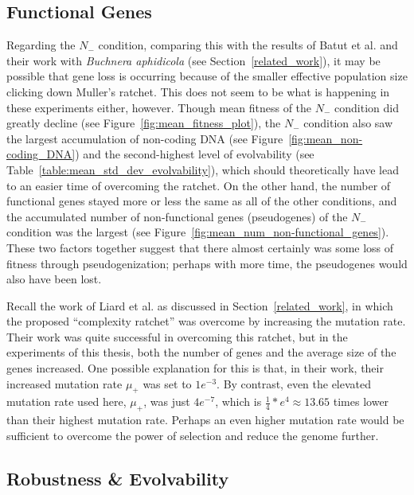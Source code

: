 \subsection{Functional Genes}
Regarding the $N_-$ condition, comparing this with the results of Batut et al. and their work with \textit{Buchnera aphidicola} (see Section~\ref{related_work}), it may be possible that gene loss is occurring because of the smaller effective population size clicking down Muller's ratchet. This does not seem to be what is happening in these experiments either, however. Though mean fitness of the $N_-$ condition did greatly decline (see Figure~\ref{fig:mean_fitness_plot}), the $N_-$ condition also saw the largest accumulation of non-coding DNA (see Figure~\ref{fig:mean_non-coding_DNA}) and the second-highest level of evolvability (see Table~\ref{table:mean_std_dev_evolvability}), which should theoretically have lead to an easier time of overcoming the ratchet. On the other hand, the number of functional genes stayed more or less the same as all of the other conditions, and the accumulated number of non-functional genes (pseudogenes) of the $N_-$ condition was the largest (see Figure~\ref{fig:mean_num_non-functional_genes}). These two factors together suggest that there almost certainly was some loss of fitness through pseudogenization; perhaps with more time, the pseudogenes would also have been lost.

Recall the work of Liard et al.\cite{Liard.2018} as discussed in Section~\ref{related_work}, in which the proposed ``complexity ratchet'' was overcome by increasing the mutation rate. Their work was quite successful in overcoming this ratchet, but in the experiments of this thesis, both the number of genes and the average size of the genes increased. One possible explanation for this is that, in their work, their increased mutation rate $\mu_+$ was set to $1e^{-3}$.  By contrast, even the elevated mutation rate used here, $\mu_+$, was just $4e^{-7}$, which is $\frac{1}{4}*e^4 \approx 13.65$ times lower than their highest mutation rate. Perhaps an even higher mutation rate would be sufficient to overcome the power of selection and reduce the genome further. 

\subsection{Robustness \& Evolvability}
%

